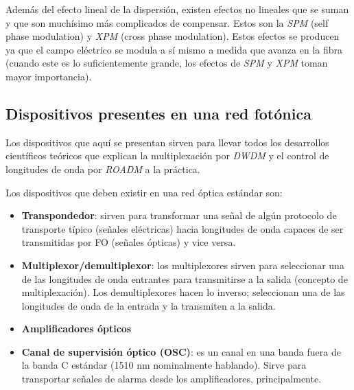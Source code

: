 Además del efecto lineal de la dispersión, existen efectos no lineales
que se suman y que son muchísimo más complicados de compensar. Estos
son la \emph{SPM} (self phase modulation) y \emph{XPM} (cross phase
modulation). Estos efectos se producen ya que el campo eléctrico se
modula a sí mismo a medida que avanza en la fibra (cuando este es lo
suficientemente grande, los efectos de \emph{SPM} y \emph{XPM} toman
mayor importancia).

\subsection{Dispositivos presentes en una red fotónica}
\label{sec:dispositivos}

Los dispositivos que aquí se presentan sirven para llevar todos los
desarrollos científicos teóricos que explican la multiplexación por
\emph{DWDM} y el control de longitudes de onda por \emph{ROADM} a la
práctica.

Los dispositivos que deben existir en una red óptica estándar son:
\begin{itemize}
\item \textbf{Transpondedor}: sirven para transformar una señal de
  algún protocolo de transporte típico (señales eléctricas) hacia
  longitudes de onda capaces de ser transmitidas por FO (señales
  ópticas) y vice versa.
\item \textbf{Multiplexor/demultiplexor}: los multiplexores sirven
  para seleccionar una de las longitudes de onda entrantes para
  transmitirse a la salida (concepto de multiplexación). Los
  demultiplexores hacen lo inverso; seleccionan una de las longitudes
  de onda de la entrada y la transmiten a la salida.
\item \textbf{Amplificadores ópticos}
\item \textbf{Canal de supervisión óptico (OSC)}: es un canal en una
  banda fuera de la banda C estándar (1510 nm nominalmente
  hablando). Sirve para transportar señales de alarma desde los
  amplificadores, principalmente.
\end{itemize}